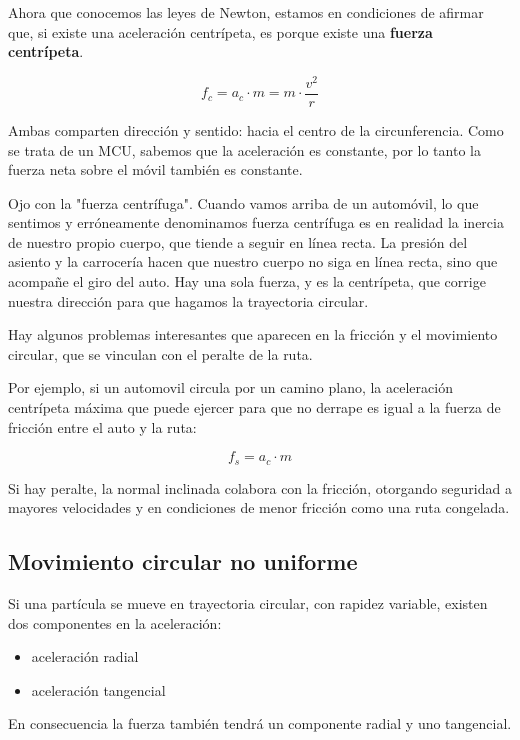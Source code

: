 Ahora que conocemos las leyes de Newton,
estamos en condiciones de afirmar que,
si existe una aceleración centrípeta,
es porque existe una \textbf{fuerza centrípeta}.

\begin{equation*}
    f_c = a_c \cdot m = m \cdot \frac{v^{2}}{r}
\end{equation*}

Ambas comparten dirección y sentido: hacia el centro de la circunferencia.
Como se trata de un MCU,
sabemos que la aceleración es constante,
por lo tanto la fuerza neta sobre el móvil también es constante.

Ojo con la "fuerza centrífuga".
Cuando vamos arriba de un automóvil,
lo que sentimos y erróneamente denominamos fuerza centrífuga es en 
realidad la inercia de nuestro propio cuerpo, 
que tiende a seguir en línea recta.
La presión del asiento y la carrocería hacen que nuestro cuerpo no siga en 
línea recta,
sino que acompañe el giro del auto.
Hay una sola fuerza, y es la centrípeta,
que corrige nuestra dirección para que hagamos la trayectoria circular.

Hay algunos problemas interesantes que aparecen en la fricción y el 
movimiento circular,
que se vinculan con el peralte de la ruta.

Por ejemplo, si un automovil circula por un camino plano,
la aceleración centrípeta máxima que puede ejercer para que no derrape 
es igual a la fuerza de fricción entre el auto y la ruta:

\begin{equation*}
    f_s = a_c \cdot m
\end{equation*}

Si hay peralte, la normal inclinada colabora con la fricción,
otorgando seguridad a mayores velocidades y en condiciones de menor fricción
como una ruta congelada.

\subsection{Movimiento circular no uniforme}

Si una partícula se mueve en trayectoria circular,
con rapidez variable,
existen dos componentes en la aceleración:
\begin{itemize}
    \item aceleración radial
    \item aceleración tangencial
\end{itemize}

En consecuencia la fuerza también tendrá un componente radial y uno tangencial.

